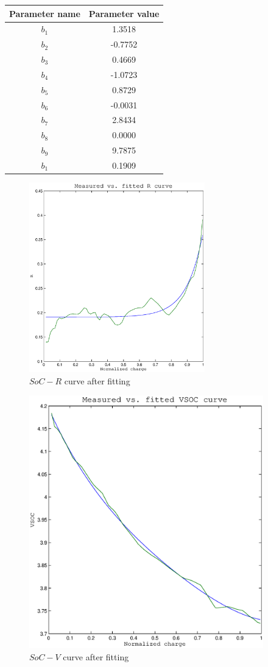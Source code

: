 \begin{center}
\begin{tabular}{|c| c|}

    \hline
    Parameter name & Parameter value \\
    \hline
    $b_{1}$ & 1.3518 \\
    $b_{2}$ & -0.7752 \\
    $b_{3}$ & 0.4669 \\
    $b_{4}$ & -1.0723 \\
    $b_{5}$ & 0.8729 \\
    $b_{6}$ & -0.0031 \\
    $b_{7}$ & 2.8434 \\
    $b_{8}$ & 0.0000 \\
    $b_{9}$ & 9.7875 \\
    $b_{1}$ & 0.1909 \\
    \hline
\end{tabular}


\begin{figure}[h]
  \centering
\includegraphics[width=3in]{fitted_r_curve}
\caption{$SoC-R$ curve after fitting}
\end{figure}


\begin{figure}[h]
  \centering
\includegraphics[width=4in]{fitted_vsoc_curve} 
\caption{$SoC-V$ curve after fitting}
\end{figure}

\end{center}


